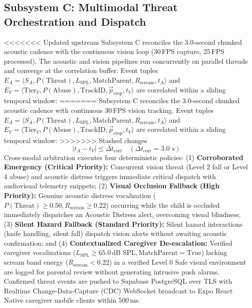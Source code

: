 \documentclass[conference]{IEEEtran}
\begin{document}
\subsection{Subsystem C: Multimodal Threat Orchestration and Dispatch}
<<<<<<< Updated upstream
Subsystem C reconciles the 3.0-second chunked acoustic cadence with the continuous vision loop (30\,FPS capture, 25\,FPS processed). The acoustic and vision pipelines run concurrently on parallel threads and converge at the correlation buffer. Event tuples $E_A = \langle S_A, P(\text{Threat}), L_{\text{SPL}}, \text{MatchParent}, R_{\text{scream}}, t_A \rangle$ and $E_V = \langle \text{Tier}_V, P(\text{Abuse}), \text{TrackID}, \vec{p}_{\text{crop}}, t_V \rangle$ are correlated within a sliding temporal window:
=======
Subsystem C reconciles the 3.0-second chunked acoustic cadence with continuous 30\,FPS vision tracking. Event tuples $E_A = \langle S_A, P(\text{Threat}), L_{\text{SPL}}, \text{MatchParent}, R_{\text{scream}}, t_A \rangle$ and $E_V = \langle \text{Tier}_V, P(\text{Abuse}), \text{TrackID}, \vec{p}_{\text{crop}}, t_V \rangle$ are correlated within a sliding temporal window:
>>>>>>> Stashed changes
\begin{equation}
|t_A - t_V| \le \Delta t_{\text{corr}} \quad (\Delta t_{\text{corr}} = 3.0\text{ s}) \label{eq7}
\end{equation}
Cross-modal arbitration executes four deterministic policies: (1) \textbf{Corroborated Emergency (Critical Priority):} Concurrent vision threat (Level 2 fall or Level 4 abuse) and acoustic distress triggers immediate critical dispatch with audiovisual telemetry snippets; (2) \textbf{Visual Occlusion Fallback (High Priority):} Genuine acoustic distress vocalization ($P(\text{Threat}) \ge 0.50, R_{\text{scream}} \ge 0.22$) occurring while the child is occluded immediately dispatches an Acoustic Distress alert, overcoming visual blindness; (3) \textbf{Silent Hazard Fallback (Standard Priority):} Silent hazard interactions (knife handling, silent fall) dispatch vision alerts without awaiting acoustic confirmation; and (4) \textbf{Contextualized Caregiver De-escalation:} Verified caregiver vocalizations ($L_{\text{SPL}} \ge 65.0\,\text{dB SPL}, \text{MatchParent} = \text{True}$) lacking scream band energy ($R_{\text{scream}} < 0.22$) in a verified Level 0 Safe visual environment are logged for parental review without generating intrusive push alarms. Confirmed threat events are pushed to Supabase PostgreSQL over TLS with Realtime Change-Data-Capture (CDC) WebSocket broadcast to Expo React Native caregiver mobile clients within 500\,ms.
\end{document}
